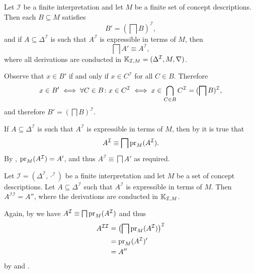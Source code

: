\begin{Proposition}
  \label{prop:connection-I-prime-2}
  Let $\mathcal{I}$ be a finite interpretation and let $M$ be a finite set of concept
  descriptions.  Then each $B \subseteq M$ satisfies
  \begin{equation*}
    B' = (\bigsqcap B)^{\mathcal{I}},
  \end{equation*}
  and if $A \subseteq \Delta^{\mathcal{I}}$ is such that $A^{\mathcal{I}}$ is expressible
  in terms of $M$, then
  \begin{equation*}
    \bigsqcap A' \equiv A^{\mathcal{I}},
  \end{equation*}
  where all derivations are conducted in ${\mathbb{K}}_{\mathcal{I}, M} = (\Delta^{\mathcal{I}},
  M, \nabla)$.
\end{Proposition}
\begin{Proof}
  Observe that $x \in B'$ if and only if $x \in C^{\mathcal{I}}$ for all $C \in B$.
  Therefore
  \begin{equation*}
    x \in B' \iff \forall C \in B \colon x \in C^{\mathcal{I}} \iff x \in \bigcap_{C \in
      B} C^{\mathcal{I}} = (\bigsqcap B)^{\mathcal{I}},
  \end{equation*}
  and therefore $B' = (\bigsqcap B)^{\mathcal{I}}$.

  If $A \subseteq \Delta^{\mathcal{I}}$ is such that $A^{\mathcal{I}}$ is expressible in
  terms of $M$, then by  it is true that
  \begin{equation*}
    A^{\mathcal{I}} \equiv \bigsqcap \operatorname{pr}_M(A^{\mathcal{I}}).
  \end{equation*}
  By , $\operatorname{pr}_M(A^{\mathcal{I}}) = A'$, and thus
  $A^{\mathcal{I}} \equiv \bigsqcap A'$ as required.
\end{Proof}

\begin{Proposition}
  \label{prop:connection-I-prime-3}
  Let $\mathcal{I} = (\Delta^{\mathcal{I}}, \cdot^{\mathcal{I}})$ be a finite
  interpretation and let $M$ be a set of concept descriptions.  Let $A \subseteq
  \Delta^{\mathcal{I}}$ such that $A^{\mathcal{I}}$ is expressible in terms of $M$.  Then
  $A^{\mathcal{I}\mathcal{I}} = A''$, where the derivations are conducted in ${\mathbb{K}}_{\mathcal{I}, M}$.
\end{Proposition}
\begin{Proof}
  Again, by  we have $A^{\mathcal{I}}
  \equiv \bigsqcap \operatorname{pr}_M(A^{\mathcal{I}})$ and thus
  \begin{align*}
    A^{\mathcal{I}\mathcal{I}}
    &= \bigl(\bigsqcap \operatorname{pr}_M(A^{\mathcal{I}})\bigr)^{\mathcal{I}} \\
    &= \operatorname{pr}_M(A^{\mathcal{I}})' \\
    &= A''
  \end{align*}
  by  and .
\end{Proof}

